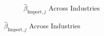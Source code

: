 \documentclass{article}
\begin{document}
\begin{figure}[ht!]
\begin{subfigure}[t]{0.32\textwidth}
        \caption{$\hat{\beta}_{\text{Import},j}$ Across Industries}
    \end{subfigure}
\end{figure}
\end{document}
